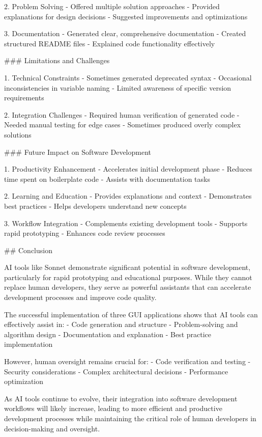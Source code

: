2. Problem Solving
   - Offered multiple solution approaches
   - Provided explanations for design decisions
   - Suggested improvements and optimizations

3. Documentation
   - Generated clear, comprehensive documentation
   - Created structured README files
   - Explained code functionality effectively

### Limitations and Challenges

1. Technical Constraints
   - Sometimes generated deprecated syntax
   - Occasional inconsistencies in variable naming
   - Limited awareness of specific version requirements

2. Integration Challenges
   - Required human verification of generated code
   - Needed manual testing for edge cases
   - Sometimes produced overly complex solutions

### Future Impact on Software Development

1. Productivity Enhancement
   - Accelerates initial development phase
   - Reduces time spent on boilerplate code
   - Assists with documentation tasks

2. Learning and Education
   - Provides explanations and context
   - Demonstrates best practices
   - Helps developers understand new concepts

3. Workflow Integration
   - Complements existing development tools
   - Supports rapid prototyping
   - Enhances code review processes

## Conclusion

AI tools like Sonnet demonstrate significant potential in software development, particularly for rapid prototyping and educational purposes. While they cannot replace human developers, they serve as powerful assistants that can accelerate development processes and improve code quality.

The successful implementation of three GUI applications shows that AI tools can effectively assist in:
- Code generation and structure
- Problem-solving and algorithm design
- Documentation and explanation
- Best practice implementation

However, human oversight remains crucial for:
- Code verification and testing
- Security considerations
- Complex architectural decisions
- Performance optimization

As AI tools continue to evolve, their integration into software development workflows will likely increase, leading to more efficient and productive development processes while maintaining the critical role of human developers in decision-making and oversight.